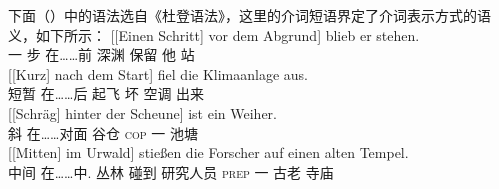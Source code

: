 下面（）中的语法选自《杜登语法》\citep[\S~1300]{Duden2005-Authors}，这里的介词短语界定了介词表示方式的语义，如下所示：
\eal
\ex\label{Beispiel-Schritt-vor-dem-Abgrund} 
\gll {}[[Einen Schritt] vor dem Abgrund] blieb er stehen.\\
	 {}\spacebr{}\spacebr{}一 步 在……前  深渊 保留 他 站\\
\ex 
\gll {}[[Kurz] nach dem Start] fiel die Klimaanlage aus.\\
	 {}\spacebr{}\spacebr{}短暂 在……后  起飞 坏  空调 出来\\
\ex 
\gll {}[[Schräg] hinter der Scheune] ist ein Weiher.\\
	 {}\spacebr{}\spacebr{}斜 在……对面  谷仓 \textsc{cop} 一 池塘\\
\ex 
\gll {}[[Mitten] im Urwald] stießen die Forscher auf einen alten Tempel.\\
	 {}\spacebr{}\spacebr{}中间 在……中. 丛林 碰到  研究人员 \textsc{prep} 一 古老 寺庙\\
\zl
